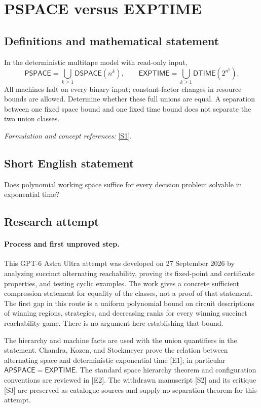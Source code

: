 \documentclass[11pt]{article}
\begin{document}
\section*{\texorpdfstring{PSPACE versus EXPTIME}{PSPACE versus EXPTIME}}\label{statement}
\subsection{Definitions and mathematical statement}
In the deterministic multitape model with read-only input,
\[
 \mathsf{PSPACE}=\bigcup_{k\ge1}\mathsf{DSPACE}(n^k),\qquad
 \mathsf{EXPTIME}=\bigcup_{k\ge1}\mathsf{DTIME}(2^{n^k}).
\]
All machines halt on every binary input; constant-factor changes in resource bounds are allowed. Determine whether these full unions are equal. A separation between one fixed space bound and one fixed time bound does not separate the two union classes.
\par\smallskip\textit{Formulation and concept references:} \href{https://art.torvergata.it/bitstream/2108/32769/60437/ComputabilityDecidabilityComplexity.pdf}{[S1]}.

\subsection{Short English statement}
Does polynomial working space suffice for every decision problem solvable in exponential time?
\subsection{Research attempt}
\paragraph{Process and first unproved step.}
This GPT-6 Astra Ultra attempt was developed on 27 September 2026 by analyzing succinct alternating reachability, proving its fixed-point and certificate properties, and testing cyclic examples. The work gives a concrete sufficient compression statement for equality of the classes, not a proof of that statement. The first gap in this route is a uniform polynomial bound on circuit descriptions of winning regions, strategies, and decreasing ranks for every winning succinct reachability game. There is no argument here establishing that bound.

The hierarchy and machine facts are used with the union quantifiers in the statement. Chandra, Kozen, and Stockmeyer prove the relation between alternating space and deterministic exponential time [E1]; in particular $\mathsf{APSPACE}=\mathsf{EXPTIME}$. The standard space hierarchy theorem and configuration conventions are reviewed in [E2]. The withdrawn manuscript [S2] and its critique [S3] are preserved as catalogue sources and supply no separation theorem for this attempt.
\end{document}
